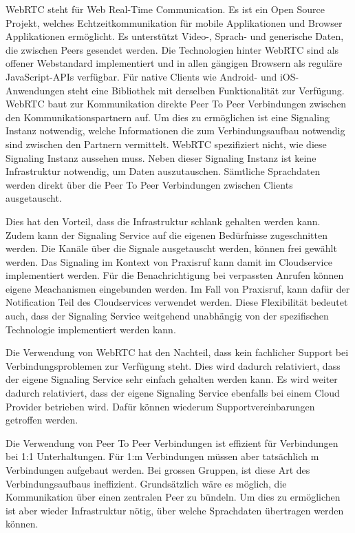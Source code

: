 WebRTC steht für Web Real-Time Communication.
Es ist ein Open Source Projekt, welches Echtzeitkommunikation für mobile Applikationen und Browser Applikationen ermöglicht.
Es unterstützt Video-, Sprach- und generische Daten, die zwischen Peers gesendet werden.
Die Technologien hinter WebRTC sind als offener Webstandard implementiert und in allen gängigen Browsern als reguläre JavaScript-APIs verfügbar.
Für native Clients wie Android- und iOS-Anwendungen steht eine Bibliothek mit derselben Funktionalität zur Verfügung.\cite{webrtc}
WebRTC baut zur Kommunikation direkte Peer To Peer Verbindungen zwischen den Kommunikationspartnern auf.
Um dies zu ermöglichen ist eine Signaling Instanz notwendig, welche Informationen die zum Verbindungsaufbau notwendig sind zwischen den Partnern vermittelt.
WebRTC spezifiziert nicht, wie diese Signaling Instanz aussehen muss.
Neben dieser Signaling Instanz ist keine Infrastruktur notwendig, um Daten auszutauschen.
Sämtliche Sprachdaten werden direkt über die Peer To Peer Verbindungen zwischen Clients ausgetauscht.

Dies hat den Vorteil, dass die Infrastruktur schlank gehalten werden kann.
Zudem kann der Signaling Service auf die eigenen Bedürfnisse zugeschnitten werden.
Die Kanäle über die Signale ausgetauscht werden, können frei gewählt werden.
Das Signaling im Kontext von Praxisruf kann damit im Cloudservice implementiert werden.
Für die Benachrichtigung bei verpassten Anrufen können eigene Meachanismen eingebunden werden.
Im Fall von Praxisruf, kann dafür der Notification Teil des Cloudservices verwendet werden.
Diese Flexibilität bedeutet auch, dass der Signaling Service weitgehend unabhängig von der spezifischen Technologie implementiert werden kann.

\clearpage

Die Verwendung von WebRTC hat den Nachteil, dass kein fachlicher Support bei Verbindungsproblemen zur Verfügung steht.
Dies wird dadurch relativiert, dass der eigene Signaling Service sehr einfach gehalten werden kann.
Es wird weiter dadurch relativiert, dass der eigene Signaling Service ebenfalls bei einem Cloud Provider betrieben wird.
Dafür können wiederum Supportvereinbarungen getroffen werden.

Die Verwendung von Peer To Peer Verbindungen ist effizient für Verbindungen bei 1:1 Unterhaltungen.
Für 1:m Verbindungen müssen aber tatsächlich m Verbindungen aufgebaut werden.
Bei grossen Gruppen, ist diese Art des Verbindungsaufbaus ineffizient.
Grundsätzlich wäre es möglich, die Kommunikation über einen zentralen Peer zu bündeln.\cite{webrtc_mesh}
Um dies zu ermöglichen ist aber wieder Infrastruktur nötig, über welche Sprachdaten übertragen werden können.

